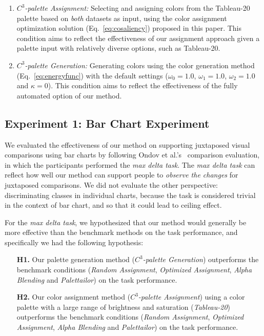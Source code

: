 \begin{enumerate}
     \item \emph{$C^3$-palette Assignment:} Selecting and assigning colors from the Tableau-20 palette based on \emph{both} datasets as input, using the color assignment optimization solution (Eq.~\ref{eq:cosaliency}) proposed in this paper. This condition aims to reflect the effectiveness of our assignment approach given a palette input with relatively diverse options, such as Tableau-20.
     \item \emph{$C^3$-palette Generation:} Generating colors using the color generation method (Eq.~\ref{eq:energyfunc}) with the default settings ($\omega_0=1.0$, $\omega_1=1.0$, $\omega_2=1.0$ and $\kappa=0$). This condition aims to reflect the effectiveness of the fully automated option of our method.
\end{enumerate}


\subsection{Experiment 1: Bar Chart Experiment}
\label{subsec:barchartExp}
We evaluated the effectiveness of our method on supporting juxtaposed visual comparisons using bar charts by following Ondov et al.'s~\cite{Ondov19} comparison evaluation, in which the participants performed the \emph{max delta task}. The \emph{max delta task} can reflect how well our method can support people to \emph{observe the changes} for juxtaposed comparisons. We did not evaluate the other perspective: discriminating classes in individual charts, because the task is considered trivial in the context of bar chart, and so that it could lead to ceiling effect.

For the \emph{max delta task}, we hypothesized that our method would generally be more effective than the benchmark methods on the task performance, and specifically we had the following hypothesis:
\begin{itemize}[noitemsep]
\setlength{\itemsep}{5pt}
    \item[\textbf{H1.}] Our palette generation method (\emph{$C^3$-palette Generation}) outperforms the benchmark conditions (\emph{Random Assignment}, \emph{Optimized Assignment}, \emph{Alpha Blending} and \emph{Palettailor}) on the task performance.
    \item [\textbf{H2.}] Our color assignment method (\emph{$C^3$-palette Assignment}) using a color palette with a large range of brightness and saturation (\emph{Tableau-20}) outperforms the benchmark conditions (\emph{Random Assignment}, \emph{Optimized Assignment}, \emph{Alpha Blending} and \emph{Palettailor}) on the task performance.
\end{itemize}

